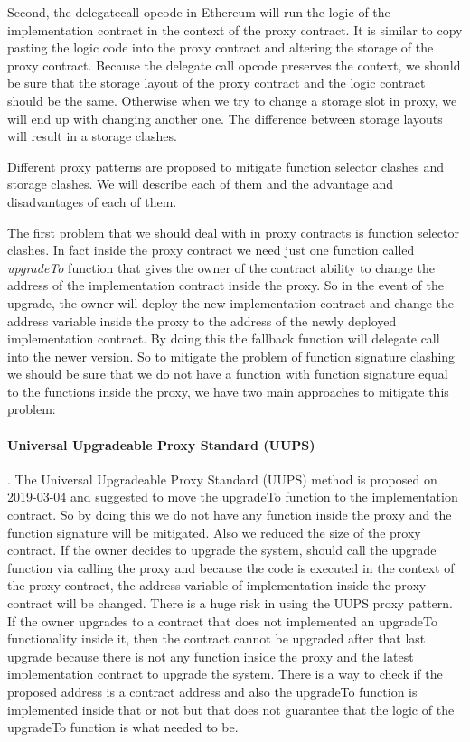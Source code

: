 Second, the delegatecall opcode in Ethereum will run the logic of the implementation contract in the context of the proxy contract. It is similar to copy pasting the logic code into the proxy contract and altering the storage of the proxy contract. Because the delegate call opcode preserves the context, we should be sure that the storage layout of the proxy contract and the logic contract should be the same. Otherwise when we try to change a storage slot in proxy, we will end up with changing another one. The difference between storage layouts will result in a storage clashes. 


Different proxy patterns are proposed to mitigate function selector clashes and storage clashes. We will describe each of them and the advantage and disadvantages of each of them.

The first problem that we should deal with in proxy contracts is function selector clashes. In fact inside the proxy contract we need just one function called \textit{upgradeTo} function that gives the owner of the contract ability to change the address of the implementation contract inside the proxy. So in the event of the upgrade, the owner will deploy the new implementation contract and change the address variable inside the proxy to the address of the newly deployed implementation contract. By doing this the fallback function will delegate call into the newer version. So to mitigate the problem of function signature clashing we should be sure that we do not have a function with function signature equal to the functions inside the proxy, we have two main approaches to mitigate this problem:

\paragraph{Universal Upgradeable Proxy Standard (UUPS)}. 
The Universal Upgradeable Proxy Standard (UUPS) method is proposed on 2019-03-04 and suggested to move the upgradeTo function to the implementation contract. So by doing this we do not have any function inside the proxy and the function signature will be mitigated. Also we reduced the size of the proxy contract. If the owner decides to upgrade the system, should call the upgrade function via calling the proxy and because the code is executed in the context of the proxy contract, the address variable of implementation inside the proxy contract will be changed.
There is a huge risk in using the UUPS proxy pattern. If the owner upgrades to a contract that does not implemented an upgradeTo functionality inside it, then the contract cannot be upgraded after that last upgrade because there is not any function inside the proxy and the latest implementation contract to upgrade the system. There is a way to check if the proposed address is a contract address and also the upgradeTo function is implemented inside that or not but that does not guarantee that the logic of the upgradeTo function is what needed to be.


